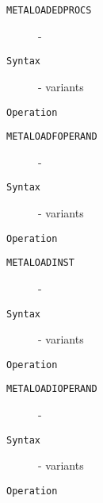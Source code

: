 \clearpage
\begin{description}
\item[\texttt{METALOADEDPROCS}]  - \\
\item[\texttt{Syntax}] - variants\\

\item[\texttt{Operation}]
\item[\texttt{}]
\end{description}
\clearpage
\begin{description}
\item[\texttt{METALOADFOPERAND}]  - \\
\item[\texttt{Syntax}] - variants\\

\item[\texttt{Operation}]
\item[\texttt{}]
\end{description}
\clearpage
\begin{description}
\item[\texttt{METALOADINST}]  - \\
\item[\texttt{Syntax}] - variants\\

\item[\texttt{Operation}]
\item[\texttt{}]
\end{description}
\clearpage
\begin{description}
\item[\texttt{METALOADIOPERAND}]  - \\
\item[\texttt{Syntax}] - variants\\

\item[\texttt{Operation}]
\item[\texttt{}]
\end{description}
